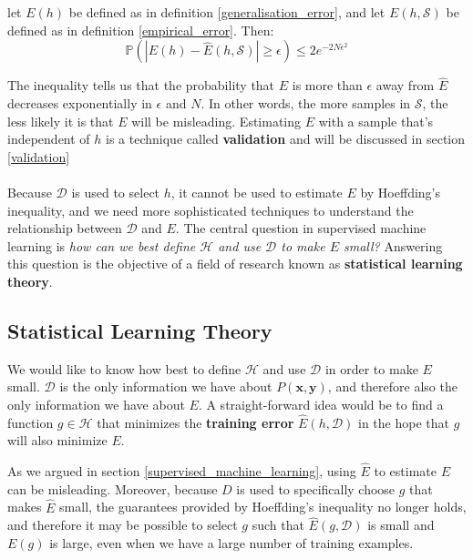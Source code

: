 \begin{theorem}
	let $E(h)$ be defined as in definition \ref{generalisation_error}, and let $E(h, \mathcal{S})$ be defined as in definition \ref{empirical_error}. Then:
	$$
	\mathbb{P}\left( |E(h) - \hat{E}(h, \mathcal{S})| \geq \epsilon \right) \leq 2e^{-2N\epsilon^2}
	$$
\end{theorem}

The inequality tells us that the probability that $E$ is more than $\epsilon$ away from $\hat{E}$ decreases exponentially in $\epsilon$ and $N$. In other words, the more samples in $\mathcal{S}$, the less likely it is that $E$ will be misleading. Estimating $E$ with a sample that's independent of $h$ is a technique called \textbf{validation} and will be discussed in section \ref{validation}
\\\\
Because $\mathcal{D}$ is used to select $h$, it cannot be used to estimate $E$ by Hoeffding's inequality, and we need more sophisticated techniques to understand the relationship between $\mathcal{D}$ and $E$. The central question in supervised machine learning is \textit{how can we best define $\mathcal{H}$ and use $\mathcal{D}$ to make $E$ small?} Answering this question is the objective of a field of research known as \textbf{statistical learning theory}.

\subsection{Statistical Learning Theory}
\label{statistical_learning_theory}
We would like to know how best to define $\mathcal{H}$ and use $\mathcal{D}$ in order to make $E$ small. $\mathcal{D}$ is the only information we have about $P(\mathbf{x}, \mathbf{y})$, and therefore also the only information we have about $E$. A straight-forward idea would be to find a function $g \in \mathcal{H}$ that minimizes the \textbf{training error} $\hat{E}(h, \mathcal{D})$ in the hope that $g$ will also minimize $E$. 

As we argued in section \ref{supervised_machine_learning}, using $\hat{E}$ to estimate $E$ can be misleading. Moreover, because $D$ is used to specifically choose $g$ that makes $\hat{E}$ small, the guarantees provided by Hoeffding's inequality no longer holds, and therefore it may be possible to select $g$ such that $\hat{E}(g, \mathcal{D})$ is small and $E(g)$ is large, even when we have a large number of training examples.


